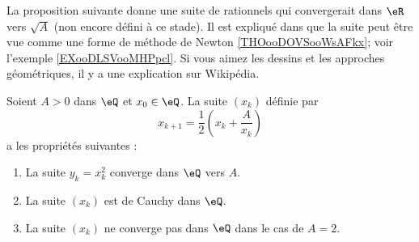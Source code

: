 La proposition suivante donne une suite de rationnels qui convergerait dans \( \eR\) vers \( \sqrt{ A }\) (non encore défini à ce stade). Il est expliqué dans \cite{BIBooMPXEooQLKhku} que la suite peut être vue comme une forme de méthode de Newton \ref{THOooDOVSooWsAFkx}; voir l'exemple \ref{EXooDLSVooMHPpcl}. Si vous aimez les dessins et les approches géométriques, il y a une explication sur Wikipédia\cite{BIBooVCWCooQcolIq}.
\begin{proposition}       \label{PROPooSTQXooHlIGVf}
    Soient \( A>0\) dans \( \eQ\) et \( x_0\in \eQ\). La suite \( (x_k)\) définie par
    \begin{equation}        \label{EQooOUIVooUqWhXe}
        x_{k+1}=\frac{ 1 }{2}\left( x_k+\frac{ A }{ x_k } \right)
    \end{equation}
    a les propriétés suivantes :
    \begin{enumerate}
        \item
            La suite \( y_k=x_k^2 \) converge dans \( \eQ\) vers \( A\).
        \item
            La suite \( (x_k)\) est de Cauchy dans \( \eQ\).
        \item
            La suite \( (x_k)\) ne converge pas dans \( \eQ\) dans le cas de \( A=2\).
    \end{enumerate}
\end{proposition}

